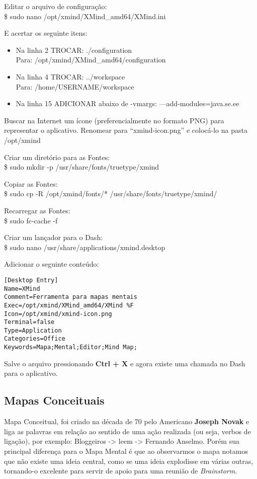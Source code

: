 Editar o arquivo de configuração: \\
{\ttfamily\$ sudo nano /opt/xmind/XMind\_amd64/XMind.ini}

E acertar os seguinte itens: \vspace{-1em}
\begin{itemize}[noitemsep]
 \item Na linha 2 TROCAR: {\ttfamily ./configuration} \\ Para: {\ttfamily /opt/xmind/XMind\_amd64/configuration}
 \item Na linha 4 TROCAR: {\ttfamily ../workspace} \\ Para: {\ttfamily /home/USERNAME/workspace}
 \item Na linha 15 ADICIONAR abaixo de -vmargs: {\ttfamily ---add-modules=java.se.ee}
\end{itemize}

Buscar na Internet um ícone (preferencialmente no formato PNG) para representar o aplicativo. Renomear para ``xmind-icon.png'' e colocá-lo na pasta /opt/xmind

Criar um diretório para as Fontes: \\
{\ttfamily\$ sudo mkdir -p /usr/share/fonts/truetype/xmind}

Copiar as Fontes: \\
{\ttfamily\$ sudo cp -R /opt/xmind/fonts/* /usr/share/fonts/truetype/xmind/}

Recarregar as Fontes: \\
{\ttfamily\$ sudo fc-cache -f}

Criar um lançador para o Dash: \\
{\ttfamily\$ sudo nano /usr/share/applications/xmind.desktop}

Adicionar o seguinte conteúdo:
\begin{lstlisting}
[Desktop Entry]
Name=XMind
Comment=Ferramenta para mapas mentais
Exec=/opt/xmind/XMind_amd64/XMind %F
Icon=/opt/xmind/xmind-icon.png
Terminal=false
Type=Application
Categories=Office
Keywords=Mapa;Mental;Editor;Mind Map;
\end{lstlisting}
Salve o arquivo pressionando \textbf{Ctrl + X} e agora existe uma chamada no Dash para o aplicativo.

\subsection{Mapas Conceituais}
Mapa Conceitual, foi criado na década de 70 pelo Americano \textbf{Joseph Novak} e liga as palavras em relação ao sentido de uma ação realizada (ou seja, verbos de ligação), por exemplo: Bloggeiros -> leem -> Fernando Anselmo. Porém sua principal diferença para o Mapa Mental é que ao observarmos o mapa notamos que não existe uma ideia central, como se uma ideia explodisse em várias outras, tornando-o excelente para servir de apoio para uma reunião de \textit{Brainstorm}. 

